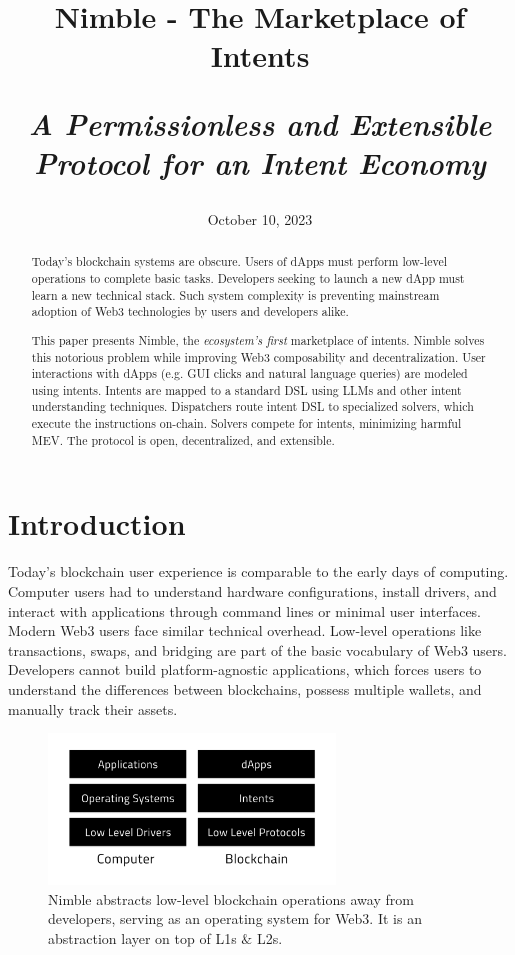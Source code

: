 \documentclass[11pt,letterpaper,twocolumn]{article}
\title{
\begin{medium}
\vspace{15pt}
  \textsf{Nimble - The Marketplace of Intents}
\end{medium} 

\begin{small}
\vspace{15pt}
  \textsf{\emph{A Permissionless and Extensible Protocol for an Intent Economy}}\\
\vspace{-20pt}
\end{small} 
\date{October 10, 2023}
}
\begin{document}
\maketitle

\begin{abstract}
Today’s blockchain systems are obscure. Users of dApps must perform low-level operations to complete basic tasks. Developers seeking to launch a new dApp must learn a new technical stack. Such system complexity is preventing mainstream adoption of Web3 technologies by users and developers alike.

This paper presents Nimble, the \emph{ecosystem's first} marketplace of intents. Nimble solves this notorious problem while improving Web3 composability and decentralization. User interactions with dApps (e.g. GUI clicks and natural language queries) are modeled using intents. Intents are mapped to a standard DSL using LLMs and other intent understanding techniques. Dispatchers route intent DSL to specialized solvers, which execute the instructions on-chain. Solvers compete for intents, minimizing harmful MEV. The protocol is open, decentralized, and extensible.
\end{abstract}

\section{Introduction}
\label{sec:introduction}
Today's blockchain user experience is comparable to the early days of computing.
Computer users had to understand hardware configurations, install drivers, and
interact with applications through command lines or minimal user interfaces.
Modern Web3 users face similar technical overhead. Low-level operations like transactions, swaps, and bridging are part of the basic vocabulary of Web3 users. Developers cannot build platform-agnostic applications, which forces users to understand the differences between blockchains, possess multiple wallets, and manually track their assets. 

\begin{figure}[t]
\centering
\includegraphics[width=3in]{fig/operating-system-analogy-hr.png}
\caption{Nimble abstracts low-level blockchain operations away from developers, serving as an operating system for Web3. It is an
abstraction layer on top of L1s $\&$ L2s.} 
\label{fig:os-analogy}
\vspace{0pt}
\end{figure}
\end{document}
